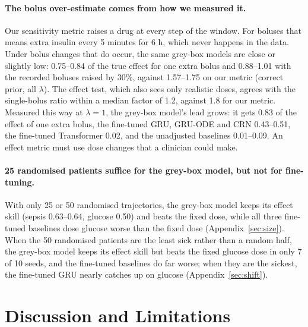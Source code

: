 \documentclass[letterpaper]{article}
\begin{document}
\paragraph{The bolus over-estimate comes from how we measured it.} Our sensitivity metric raises a drug at every step of the window. For boluses that means extra insulin every 5 minutes for 6 h, which never happens in the data. Under bolus changes that do occur, the same grey-box models are close or slightly low: 0.75--0.84 of the true effect for one extra bolus and 0.88--1.01 with the recorded boluses raised by 30\%, against 1.57--1.75 on our metric (correct prior, all $\lambda$). The effect test, which also sees only realistic doses, agrees with the single-bolus ratio within a median factor of 1.2, against 1.8 for our metric. Measured this way at $\lambda=1$, the grey-box model's lead grows: it gets 0.83 of the effect of one extra bolus, the fine-tuned GRU, GRU-ODE and CRN 0.43--0.51, the fine-tuned Transformer 0.02, and the unadjusted baselines 0.01--0.09. An effect metric must use dose changes that a clinician could make.

\paragraph{25 randomised patients suffice for the grey-box model, but not for fine-tuning.} With only 25 or 50 randomised trajectories, the grey-box model keeps its effect skill (sepsis 0.63--0.64, glucose 0.50) and beats the fixed dose, while all three fine-tuned baselines dose glucose worse than the fixed dose (Appendix~\ref{sec:size}). When the 50 randomised patients are the least sick rather than a random half, the grey-box model keeps its effect skill but beats the fixed glucose dose in only 7 of 10 seeds, and the fine-tuned baselines do far worse; when they are the sickest, the fine-tuned GRU nearly catches up on glucose (Appendix~\ref{sec:shift}).

\section{Discussion and Limitations}
\end{document}
